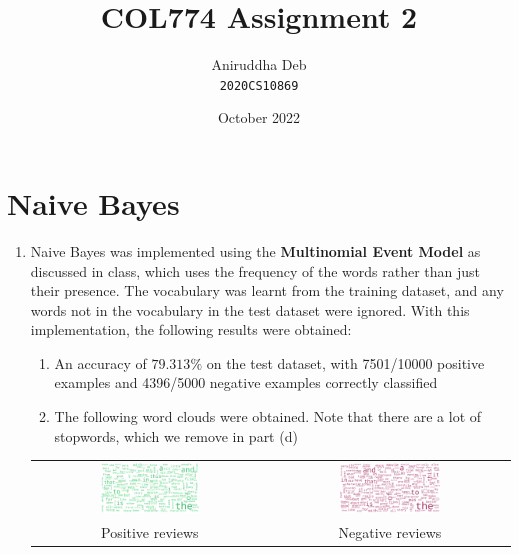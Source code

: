 \documentclass[12pt]{article}
\title{\textbf{COL774 Assignment 2}}
\author{Aniruddha Deb \\ \texttt{2020CS10869}}
\date{October 2022}
\begin{document}
\maketitle

\section{Naive Bayes}

\begin{enumerate}[label=(\alph*)]
  
    \item Naive Bayes was implemented using the \textbf{Multinomial Event Model} as discussed in class, which uses the frequency of the words rather than just their presence. The vocabulary was learnt from the training dataset, and any words not in the vocabulary in the test dataset were ignored. With this implementation, the following results were obtained:
    \begin{enumerate}[label=\roman*.]
        \item An accuracy of $79.313\%$ on the test dataset, with 7501/10000 positive examples and 4396/5000 negative examples correctly classified
        \item The following word clouds were obtained. Note that there are a lot of stopwords, which we remove in part (d)
    \end{enumerate}
    \begin{center}
        \begin{tabular}{c c}
            \includegraphics[width=0.44\textwidth]{../Q1/Qa/wc_pos.png} & \includegraphics[width=0.44\textwidth]{../Q1/Qa/wc_neg.png} \\
            Positive reviews & Negative reviews
        \end{tabular}
    \end{center}
    

\end{enumerate}
\end{document}
